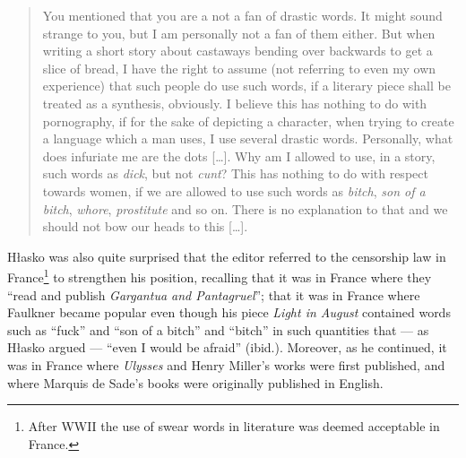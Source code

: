\begin{paper}
\begin{quote}
You mentioned that you are a not a fan of drastic words. It might sound
strange to you, but I am personally not a fan of them either. But when
writing a short story about castaways bending over backwards to get a
slice of bread, I have the right to assume (not referring to even my own
experience) that such people do use such words, if a literary piece
shall be treated as a synthesis, obviously. I believe this has nothing
to do with pornography, if for the sake of depicting a character, when
trying to create a language which a man uses, I use several drastic
words. Personally, what does infuriate me are the dots {[}\ldots{}{]}.
Why am I allowed to use, in a story, such words as \emph{dick}, but not
\emph{cunt}? This has nothing to do with respect towards women, if we
are allowed to use such words as \emph{bitch},\emph{ son of a
bitch},\emph{ whore},\emph{ prostitute} and so on. There is no
explanation to that and we should not bow our heads to this {[}\ldots{}{]}.
  \begin{flushright}
  \citep{hlasko_kor_1962}
  \end{flushright}
\end{quote}


\noindent Hłasko was also quite surprised that the editor referred to the censorship law in France\footnote{After
  WWII the use of swear words in literature was deemed acceptable in France.} to strengthen
his position,
recalling that it was in France where they ``read and publish \emph{Gargantua
and Pantagruel}''; that it was in France where Faulkner became popular even though his piece
\emph{Light in August} contained words such as ``fuck'' and ``son of a
bitch'' and ``bitch'' in such quantities that --- as Hłasko argued --- ``even I
would be afraid'' (ibid.). Moreover, as he continued, it was in France where
\emph{Ulysses} and Henry Miller's works were first published, and where Marquis de Sade's books were
originally published in English.


\end{paper}
